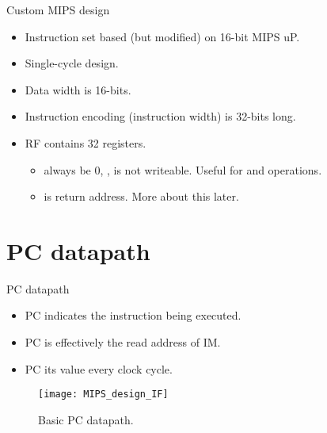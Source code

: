\documentclass[]{slides}
\begin{document}
% 
\begin{frame}{Custom MIPS design}
\begin{itemize}
\item Instruction set based (but modified) on 16-bit \ac{MIPS} \ac{uP}.
\item Single-cycle design.
\item Data width is 16-bits.
\item Instruction encoding (instruction width) is 32-bits long.
\item \ac{RF} contains 32 registers.
\begin{itemize}
\item {}  always be 0, \ie,  is not writeable. Useful for  and  operations.
\item {} is return address. More about this later.
\end{itemize}
\end{itemize}
\end{frame}

\section{PC datapath}
% 
\begin{frame}{\ac{PC} datapath}
\begin{itemize}
\item \ac{PC} indicates the instruction being executed.
\item \ac{PC} is effectively the read address of \ac{IM}.
\item \ac{PC}  its value every clock cycle.
\end{itemize}
  \begin{figure}
  \centering
  \texttt{[image: MIPS\_design\_IF]}
  \caption{Basic \ac{PC} datapath.}
  \label{Figure:non_pipelined_IF}
  \end{figure}
  
\end{frame}
\end{document}
